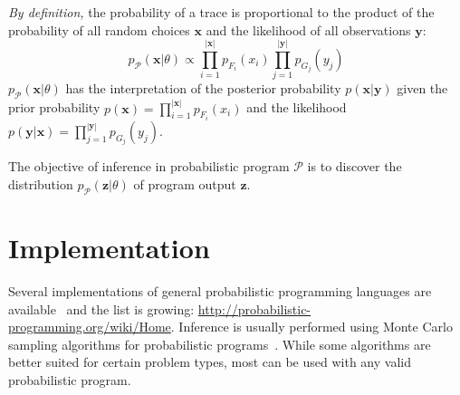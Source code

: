 \documentclass[a4paper,oneside]{article}
\begin{document}
\emph{By definition,} the probability of a trace is proportional
to the product of the probability of all random choices
$\pmb{x}$ and the likelihood of all observations $\pmb{y}$:
\begin{equation}
	p_{\mathcal{P}}(\pmb{x}|\theta) \propto \prod_{i=1}^{\left|\pmb{x}\right|}
	p_{F_i}(x_i) \prod_{j=1}^{\left|\pmb{y}\right|}p_{G_j}(y_{j})
  \label{eqn:p-trace}
\end{equation}
$p_{\mathcal{P}}(\pmb{x}|\theta)$ has the interpretation of the
posterior probability $p(\pmb{x}|\pmb{y})$ given the prior
probability $p(\pmb{x}) = \prod_{i=1}^{\left|\pmb{x}\right|}
p_{F_i}(x_i)$ and the likelihood $p(\pmb{y}|\pmb{x}) =
\prod_{j=1}^{\left|\pmb{y}\right|} p_{G_j}(y_{j})$.

The objective of inference in probabilistic program
$\mathcal{P}$ is to discover the distribution
$p_{\mathcal{P}}(\pmb{z}|\theta)$ of program output $\pmb{z}$.

\section*{Implementation}

Several implementations of general probabilistic programming
languages are available~\cite{GMR+08,MSP14,WVM14} and the list
is growing: \url{http://probabilistic-programming.org/wiki/Home}.
Inference is usually performed using Monte Carlo sampling
algorithms for probabilistic programs~\cite{WSG11,WVM14,PWD+14}.
While some algorithms are better suited for certain problem
types, most can be used with any valid probabilistic program.



\end{document}
